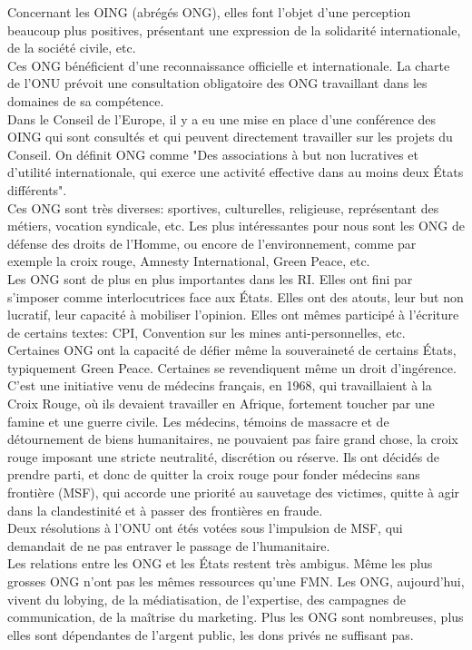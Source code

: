 \documentclass[10pt, a4paper, openany]{book}
\begin{document}
Concernant les OING (abrégés ONG), elles font l'objet d'une perception beaucoup plus positives, présentant une expression de la solidarité internationale, de la société civile, etc. \\
Ces ONG bénéficient d'une reconnaissance officielle et internationale. La charte de l'ONU prévoit une consultation obligatoire des ONG travaillant dans les domaines de sa compétence. \\
Dans le Conseil de l'Europe, il y a eu une mise en place d'une conférence des OING qui sont consultés et qui peuvent directement travailler sur les projets du Conseil. On définit ONG comme "Des associations à but non lucratives et d'utilité internationale, qui exerce une activité effective dans au moins deux États différents". \\
Ces ONG sont très diverses: sportives, culturelles, religieuse, représentant des métiers, vocation syndicale, etc. Les plus intéressantes pour nous sont les ONG de défense des droits de l'Homme, ou encore de l'environnement, comme par exemple la croix rouge, Amnesty International, Green Peace, etc. \\
Les ONG sont de plus en plus importantes dans les RI. Elles ont fini par s'imposer comme interlocutrices face aux États. Elles ont des atouts, leur but non lucratif, leur capacité à mobiliser l'opinion. Elles ont mêmes participé à l'écriture de certains textes: CPI, Convention sur les mines anti-personnelles, etc.  \\
Certaines ONG ont la capacité de défier même la souveraineté de certains États, typiquement Green Peace. Certaines se revendiquent même un droit d'ingérence. C'est une initiative venu de médecins français, en 1968, qui travaillaient à la Croix Rouge, où ils devaient travailler en Afrique, fortement toucher par une famine et une guerre civile. Les médecins, témoins de massacre et de détournement de biens humanitaires, ne pouvaient pas faire grand chose, la croix rouge imposant une stricte neutralité, discrétion ou réserve. Ils ont décidés de prendre parti, et donc de quitter la croix rouge pour fonder médecins sans frontière (MSF), qui accorde une priorité au sauvetage des victimes, quitte à agir dans la clandestinité et à passer des frontières en fraude. \\
Deux résolutions à l'ONU ont étés votées sous l'impulsion de MSF, qui demandait de ne pas entraver le passage de l'humanitaire. \\
Les relations entre les ONG et les États restent très ambigus. Même les plus grosses ONG n'ont pas les mêmes ressources qu'une FMN. Les ONG, aujourd'hui, vivent du lobying, de la médiatisation, de l'expertise, des campagnes de communication, de la maîtrise du marketing. Plus les ONG sont nombreuses, plus elles sont dépendantes de l'argent public, les dons privés ne suffisant pas.
\end{document}
